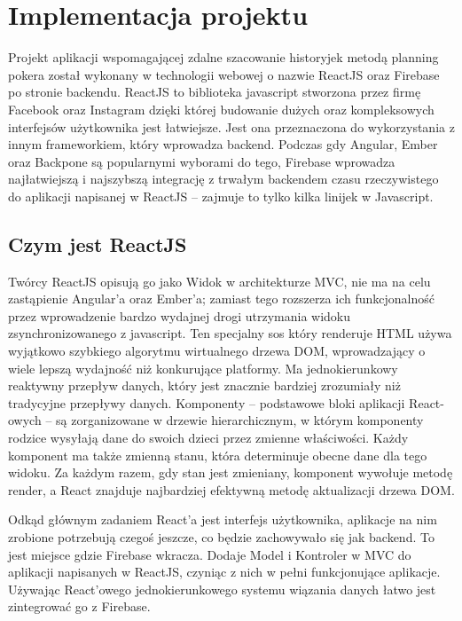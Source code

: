 
\chapter{Implementacja projektu}

Projekt aplikacji wspomagającej zdalne szacowanie historyjek metodą planning pokera został wykonany w technologii webowej
o nazwie ReactJS oraz Firebase po stronie backendu.
ReactJS to biblioteka javascript stworzona przez firmę Facebook
oraz Instagram dzięki której budowanie dużych oraz kompleksowych interfejsów użytkownika jest łatwiejsze.
Jest ona przeznaczona do wykorzystania z innym frameworkiem, który wprowadza backend.
Podczas gdy Angular, Ember oraz Backpone są popularnymi wyborami do tego,
Firebase wprowadza najłatwiejszą i najszybszą integrację z trwałym backendem
czasu rzeczywistego do aplikacji napisanej w ReactJS – zajmuje to tylko kilka linijek w Javascript. 

\section{Czym jest ReactJS}

Twórcy ReactJS opisują go jako Widok w architekturze MVC,
nie ma na celu zastąpienie Angular’a oraz Ember’a;
zamiast tego rozszerza ich funkcjonalność przez wprowadzenie bardzo wydajnej drogi utrzymania widoku zsynchronizowanego z javascript.
Ten specjalny sos który renderuje HTML używa wyjątkowo szybkiego algorytmu wirtualnego drzewa DOM,
wprowadzający o wiele lepszą wydajność niż konkurujące platformy. Ma jednokierunkowy reaktywny przepływ danych,
który jest znacznie bardziej zrozumiały niż tradycyjne przepływy danych.
Komponenty – podstawowe bloki aplikacji React-owych – są zorganizowane w drzewie hierarchicznym,
w którym komponenty rodzice wysyłają dane do swoich dzieci przez zmienne właściwości.
Każdy komponent ma także zmienną stanu, która determinuje obecne dane dla tego widoku.
Za każdym razem, gdy stan jest zmieniany, komponent wywołuje metodę render, a React znajduje najbardziej efektywną metodę aktualizacji drzewa DOM\@.

Odkąd głównym zadaniem React’a jest interfejs użytkownika,
aplikacje na nim zrobione potrzebują czegoś jeszcze,
co będzie zachowywało się jak backend.
To jest miejsce gdzie Firebase wkracza.
Dodaje Model i Kontroler w MVC do aplikacji napisanych w ReactJS, czyniąc z nich w pełni funkcjonujące aplikacje.
Używając React’owego jednokierunkowego systemu wiązania danych łatwo jest zintegrować go z Firebase.\cite{www_react}

